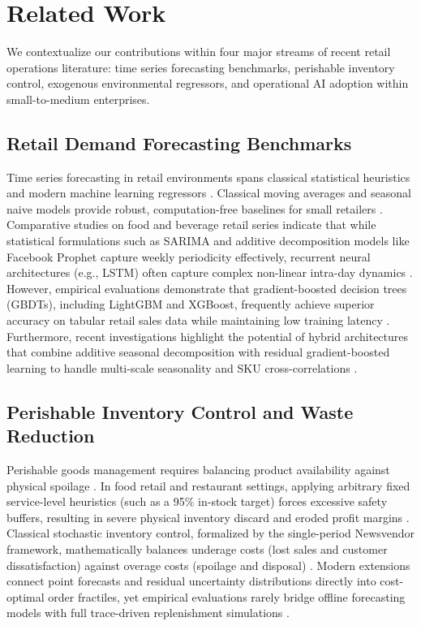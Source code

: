\documentclass[conference]{IEEEtran}
\begin{document}
\section{Related Work}
We contextualize our contributions within four major streams of recent retail operations literature: time series forecasting benchmarks, perishable inventory control, exogenous environmental regressors, and operational AI adoption within small-to-medium enterprises.

\subsection{Retail Demand Forecasting Benchmarks}
Time series forecasting in retail environments spans classical statistical heuristics and modern machine learning regressors \cite{access2025supply, gartner2024automated}. Classical moving averages and seasonal naive models provide robust, computation-free baselines for small retailers \cite{susanto2023performance}. Comparative studies on food and beverage retail series indicate that while statistical formulations such as SARIMA and additive decomposition models like Facebook Prophet capture weekly periodicity effectively, recurrent neural architectures (e.g., LSTM) often capture complex non-linear intra-day dynamics \cite{iccraids2026comparative, munawar2026lstm}. However, empirical evaluations demonstrate that gradient-boosted decision trees (GBDTs), including LightGBM and XGBoost, frequently achieve superior accuracy on tabular retail sales data while maintaining low training latency \cite{ganguly2024enhancing, sandeep2023smart, jatte2025optimization}. Furthermore, recent investigations highlight the potential of hybrid architectures that combine additive seasonal decomposition with residual gradient-boosted learning to handle multi-scale seasonality and SKU cross-correlations \cite{iciptm2026predictive, ictmod2025state, iccraids2026evaluation}.

\subsection{Perishable Inventory Control and Waste Reduction}
Perishable goods management requires balancing product availability against physical spoilage \cite{chowdhury2025predictive, iconstem2025aidriven}. In food retail and restaurant settings, applying arbitrary fixed service-level heuristics (such as a 95\% in-stock target) forces excessive safety buffers, resulting in severe physical inventory discard and eroded profit margins \cite{avuduri2025smartstock}. Classical stochastic inventory control, formalized by the single-period Newsvendor framework, mathematically balances underage costs (lost sales and customer dissatisfaction) against overage costs (spoilage and disposal) \cite{cherian2025demand}. Modern extensions connect point forecasts and residual uncertainty distributions directly into cost-optimal order fractiles, yet empirical evaluations rarely bridge offline forecasting models with full trace-driven replenishment simulations \cite{chowdhury2025predictive}.
\end{document}
